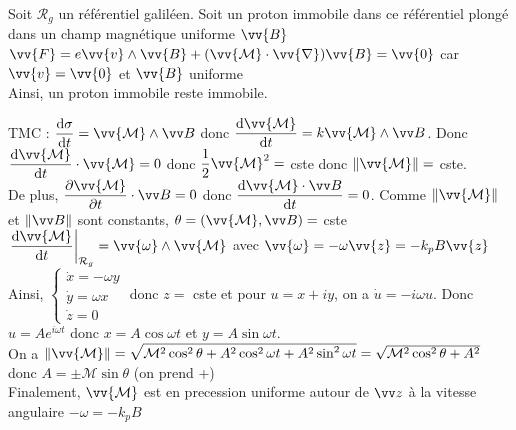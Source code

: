 ﻿\documentclass[a4paper]{article}
\begin{document}
\pagestyle{fancy}
\fancyhf{}
\setlength{\headheight}{15pt}

\begin{center}
	\large{}
\end{center}


Soit $\mathcal{R}_g$ un référentiel galiléen. Soit un proton immobile dans ce référentiel plongé dans un champ magnétique uniforme $\vv{B}$\\
$\vv{F}=e\vv{v}\wedge\vv{B}+(\vv{\mathcal{M}}\cdot\vv{\nabla})\vv{B}=\vv{0}$ car $\vv{v}=\vv{0}$ et $\vv{B}$ uniforme\\
Ainsi, un proton immobile reste immobile.\par
TMC : $\dfrac{\mathrm{d}\sigma}{\mathrm{d}t}=\vv{\mathcal{M}}\wedge\vv B$ donc $\dfrac{\mathrm{d}\vv{\mathcal{M}}}{\mathrm{d}t}=k\vv{\mathcal{M}}\wedge\vv B$. Donc $\dfrac{\mathrm{d}\vv{\mathcal{M}}}{\mathrm{d}t}\cdot\vv{\mathcal{M}}=0$ donc $\dfrac{1}{2}\vv{\mathcal{M}}^2=$ cste donc $\Vert\vv{\mathcal{M}}\Vert=$ cste.\\
De plus, $\dfrac{\partial\vv{\mathcal{M}}}{\partial t}\cdot\vv B=0$ donc $\dfrac{\mathrm{d}\vv{\mathcal{M}}\cdot\vv B}{\mathrm{d}t}=0$. Comme $\Vert\vv{\mathcal{M}}\Vert$ et $\Vert\vv B\Vert$ sont constants, $\theta=(\vv{\mathcal{M}},\vv B)=$ cste\\
$\left.\dfrac{\mathrm{d}\vv{\mathcal{M}}}{\mathrm{d}t}\right|_{\mathcal{R}_g}=\vv{\omega}\wedge\vv{\mathcal{M}}$ avec $\vv{\omega}=-\omega\vv{z}=-k_pB\vv{z}$\\
Ainsi, $\left\{\begin{array}{l} \dot x=-\omega y \\ \dot y=\omega x \\ \dot z=0 \end{array}\right.$ donc $z=$ cste et pour $u=x+iy$, on a $\dot u=-i\omega u$. Donc $u=Ae^{i\omega t}$ donc $x=A\cos\omega t$ et $y=A\sin\omega t$.\\
On a $\Vert\vv{\mathcal{M}}\Vert=\sqrt{\mathcal{M}^2\cos^2\theta+A^2\cos^2\omega t+A^2\sin^2\omega t}=\sqrt{\mathcal{M}^2\cos^2\theta+A^2}$ donc $A=\pm \mathcal{M}\sin\theta$ (on prend +)\\
Finalement, $\vv{\mathcal{M}}$ est en precession uniforme autour de $\vv z$ à la vitesse angulaire $-\omega=-k_pB$
\par
\end{document}

